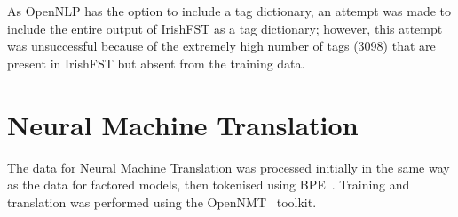 As OpenNLP has the option to include a tag dictionary, an attempt was made to include the entire output
of IrishFST as a tag dictionary; however, this attempt was unsuccessful because of the extremely high
number of tags (3098) that are present in IrishFST but absent from the training data.




\section{Neural Machine Translation}
\label{sect:ch3nmt}

The data for Neural Machine Translation was processed initially in the same way as the data for factored models,
then tokenised using BPE~\cite{sennrich2015neural}. Training and translation was performed using the OpenNMT~\citep{2017opennmt}
toolkit.